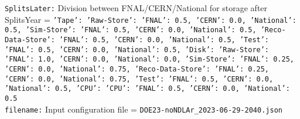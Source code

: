 {\tt SplitsLater:} Division between FNAL/CERN/National for storage after SplitsYear = {\tt {'Tape': {'Raw-Store': {'FNAL': 0.5, 'CERN': 0.0, 'National': 0.5}, 'Sim-Store': {'FNAL': 0.5, 'CERN': 0.0, 'National': 0.5}, 'Reco-Data-Store': {'FNAL': 0.5, 'CERN': 0.0, 'National': 0.5}, 'Test': {'FNAL': 0.5, 'CERN': 0.0, 'National': 0.5}}, 'Disk': {'Raw-Store': {'FNAL': 1.0, 'CERN': 0.0, 'National': 0.0}, 'Sim-Store': {'FNAL': 0.25, 'CERN': 0.0, 'National': 0.75}, 'Reco-Data-Store': {'FNAL': 0.25, 'CERN': 0.0, 'National': 0.75}, 'Test': {'FNAL': 0.5, 'CERN': 0.0, 'National': 0.5}}, 'CPU': {'CPU': {'FNAL': 0.5, 'CERN': 0.0, 'National': 0.5}}}} \\
{\tt filename:} Input configuration file = {\tt DOE23-noNDLAr\_2023-06-29-2040.json} \\
